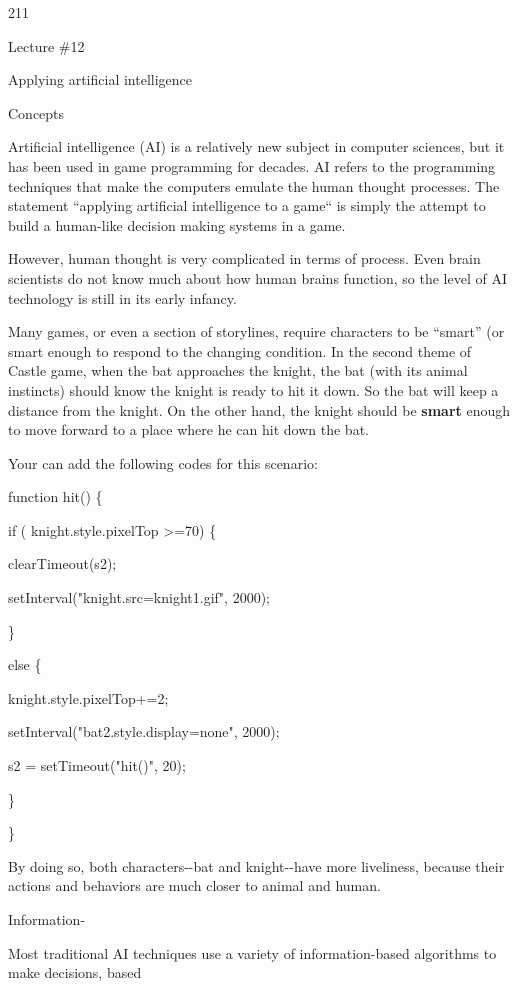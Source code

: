 \documentclass[
]{article}
\begin{document}
211

\protect\hypertarget{index_split_011.htmlux5cux23p212}{}{}

Lecture \#12

Applying artificial intelligence

Concepts

Artificial intelligence (AI) is a relatively new subject in computer
sciences, but it has been used in game programming for decades. AI
refers to the programming techniques that make the computers emulate the
human thought processes. The statement ``applying artificial
intelligence to a game`` is simply the attempt to build a human-like
decision making systems in a game.

However, human thought is very complicated in terms of process. Even
brain scientists do not know much about how human brains function, so
the level of AI technology is still in its early infancy.

Many games, or even a section of storylines, require characters to be
``smart'' (or smart enough to respond to the changing condition. In the
second theme of Castle game, when the bat approaches the knight, the bat
(with its animal instincts) should know the knight is ready to hit it
down. So the bat will keep a distance from the knight. On the other
hand, the knight should be \textbf{smart} enough to move forward to a
place where he can hit down the bat.

Your can add the following codes for this scenario:

function hit() \{

if ( knight.style.pixelTop \textgreater=70) \{

clearTimeout(s2);

setInterval("knight.src=\textquotesingle knight1.gif\textquotesingle",
2000);

\}

else \{

knight.style.pixelTop+=2;

setInterval("bat2.style.display=\textquotesingle none\textquotesingle",
2000);

s2 = setTimeout("hit()", 20);

\}

\}

By doing so, both characters-\/-bat and knight-\/-have more liveliness,
because their actions and behaviors are much closer to animal and human.

Information-

Most traditional AI techniques use a variety of information-based
algorithms to make decisions, based
\end{document}
